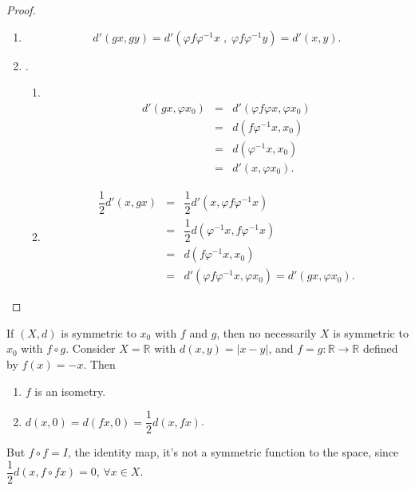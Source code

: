 \documentclass{amsart}
\begin{document}
\begin{proof}
	\begin{enumerate}
		\item {}
			\[
				d' (gx,gy) = d' (\varphi f \varphi ^{-1} x \;,\; \varphi f \varphi ^{-1} y) = d'(x,y).
			\]
		\item {}.
			\begin{enumerate}
				\item \(\)
					\[
						\begin{array}{rcl}
							d' (gx, \varphi x_0) & = & d' (\varphi f \varphi x, \varphi x_0) \\[2mm]
							& = & d(f \varphi ^{-1} x, x_0) \\[2mm]
							& = & d(\varphi ^{-1} x,x_0) \\[2mm]
							& = & d' (x, \varphi x_0).
						\end{array}
					\]
				\item 
					\[
						\begin{array}{rcl}
							\dfrac{1}{2} d'(x,gx) & = & \dfrac{1}{2} d' (x, \varphi f \varphi ^{-1} x) \\[2mm]
							& = & \dfrac{1}{2} d(\varphi ^{-1} x, f \varphi ^{-1} x) \\[2mm]
							& = & d(f \varphi ^{-1} x, x_0) \\[2mm]
							& = & d' (\varphi f \varphi ^{-1} x, \varphi x_0) = d' (gx, \varphi x_0).
						\end{array}
					\]
			\end{enumerate}
	\end{enumerate}
\end{proof}
\begin{example}
	If \((X,d)\) is symmetric to \(x_0\) with \(f\) and \(g\), then no necessarily \(X\) is symmetric to \(x_0\) with \(f \circ g\).
	Consider \(X = \mathbb{R}\) with \(d(x,y) = |x-y|\), and \(f = g: \mathbb{R} \longrightarrow \mathbb{R}\) defined by \(f(x) = -x\). Then
	\begin{enumerate}
		\item \(f\) is an isometry.
		\item \(d(x,0) = d(fx,0) = \dfrac{1}{2} d(x,fx)\).
	\end{enumerate}
	But \(f \circ f = I\), the identity map, it's not a symmetric function to the space, since \(\dfrac{1}{2} d(x, f \circ fx) = 0\), \(\forall x \in X\).
\end{example}
\end{document}

